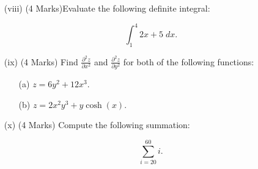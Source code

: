 \documentclass[a4paper,12pt]{article}
\begin{document}
\begin{itemize}
\begin{multicols}{2}
\begin{itemize}
	\end{itemize}
	\end{multicols}

	\smallskip
	\item[(viii)] (4 Marks)Evaluate the following definite integral:
	
	\[  \int^{4}_{1}  2x+5\; dx.  \]
	\smallskip

	
%	
	
	
	\item[(ix)] (4 Marks) Find $\displaystyle{ \frac{ \partial^2 z }{ \partial x^2 }}$ and $\displaystyle{ \frac{ \partial^2 z }{ \partial y^2 }}$  for both of the following functions:
\smallskip
	\begin{multicols}{2}
		\begin{itemize}
			\item[(a)] $\displaystyle{  z = 6y^2 + 12x^3. }  $
				\item[(b)] $\displaystyle{  z = 2x^2y^3 + y\cosh(x).}$
				
			\end{itemize}
		\end{multicols}
		\medskip
	\item[(x)] (4 Marks)  Compute the following summation:
	
	\[ \sum_{i=20}^{60} i . \]
\end{itemize}





	

	
%		
%
%
%		
%
\end{document}
